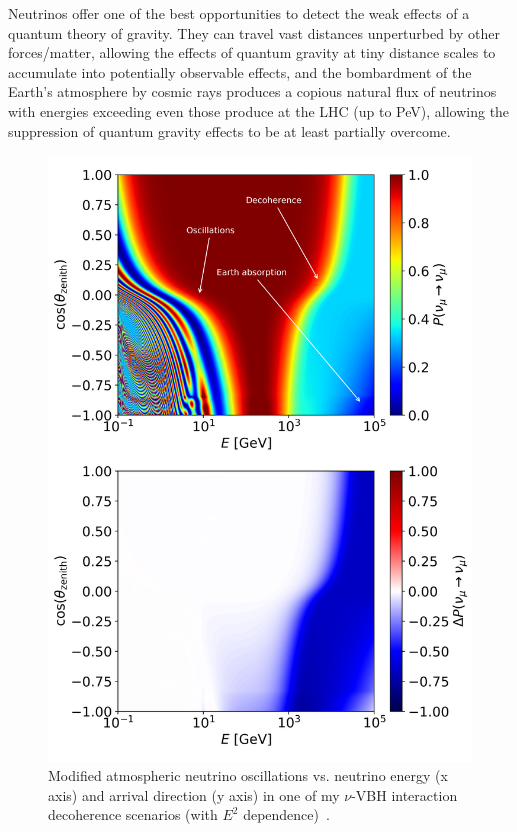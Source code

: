 \documentclass[a4paper,11pt]{article}
\newcounter{bar}
\begin{document}
Neutrinos offer one of the best opportunities to detect the weak effects of a quantum theory of gravity. They can travel vast distances unperturbed by other forces/matter, allowing the effects of quantum gravity at tiny distance scales to accumulate into potentially observable effects, and the bombardment of the Earth's atmosphere by cosmic rays produces a copious natural flux of neutrinos with energies exceeding even those produce at the LHC (up to PeV), allowing the suppression of quantum gravity effects to be at least partially overcome. 

\begin{figure} %
    \centering
    \vspace{-7pt}
    \includegraphics[trim=0.0cm 12.7cm 0.cm 0.2cm, clip=true, width=1.\linewidth]{images/atmo_oscillogram_randomize_flavor_n2_matter.png}
    \caption{Modified atmospheric neutrino oscillations vs. neutrino energy (x axis) and arrival direction (y axis) in one of my $\nu$-VBH interaction decoherence scenarios (with $E^2$ dependence)~\cite{PhysRevD.102.115003}.}
    \vspace{-5pt}
    \label{fig:decoh_oscillogram}
\end{figure}
\end{document}

